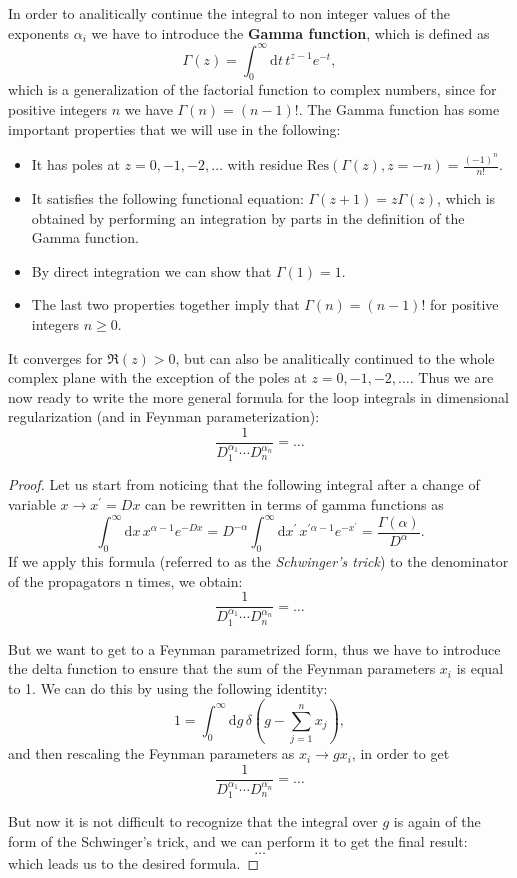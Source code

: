 In order to analitically continue the integral to non integer values of the exponents \(\alpha_i\) we have to introduce the \textbf{Gamma function}, which is defined as
\[
    \Gamma(z) = \int_0^{\infty} \mathrm{d} t \, t^{z-1} e^{-t},
\]
which is a generalization of the factorial function to complex numbers, since for positive integers \(n\) we have \(\Gamma(n) = (n-1)!\). The Gamma function has some important properties that we will use in the following:
\begin{itemize}
    \item It has poles at \(z = 0, -1, -2, \dots\) with residue \(\text{Res}(\Gamma(z), z=-n) = \frac{(-1)^n}{n!}\).
    \item It satisfies the following functional equation: \(\Gamma(z+1) = z \Gamma(z)\), which is obtained by performing an integration by parts in the definition of the Gamma function.
    \item By direct integration we can show that \(\Gamma(1) = 1\).
    \item The last two properties together imply that \(\Gamma(n) = (n-1)!\) for positive integers \(n \geq 0\).
\end{itemize}
It converges for \(\Re(z) > 0\), but can also be analitically continued to the whole complex plane with the exception of the poles at \(z = 0, -1, -2, \dots\). Thus we are now ready to write the more general formula for the loop integrals in dimensional regularization (and in Feynman parameterization):
\[
    \frac{1}{D_1^{\alpha_1} \cdots D_n^{\alpha_n}} = \dots
\]

\begin{proof}
    Let us start from noticing that the following integral after a change of variable \(x \to x^{\prime} =  D x\) can be rewritten in terms of gamma functions as
    \[
        \int_0^{\infty} \mathrm{d} x \, x^{\alpha - 1} e^{-D x} = D^{-\alpha} \int_0^{\infty} \mathrm{d} x^{\prime} \, x^{\prime \alpha - 1} e^{-x^{\prime}} = \frac{\Gamma(\alpha)}{D^{\alpha}}.
    \]
    If we apply this formula (referred to as the \textit{Schwinger's trick}) to the denominator of the propagators n times, we obtain:
    \[
        \frac{1}{D_1^{\alpha_1} \cdots D_n^{\alpha_n}} = \dots
    \]

    But we want to get to a Feynman parametrized form, thus we have to introduce the delta function to ensure that the sum of the Feynman parameters \(x_i\) is equal to 1. We can do this by using the following identity:
    \[
        1 = \int_0^{\infty} \mathrm{d} g \, \delta\left( g - \sum_{j=1}^n x_j\right),
    \]
    and then rescaling the Feynman parameters as \(x_i \to g x_i\), in order to get
    \[
        \frac{1}{D_1^{\alpha_1} \cdots D_n^{\alpha_n}} = \dots
    \]

    But now it is not difficult to recognize that the integral over \(g\) is again of the form of the Schwinger's trick, and we can perform it to get the final result:
    \[
        \dots
    \]
    which leads us to the desired formula.
\end{proof}

